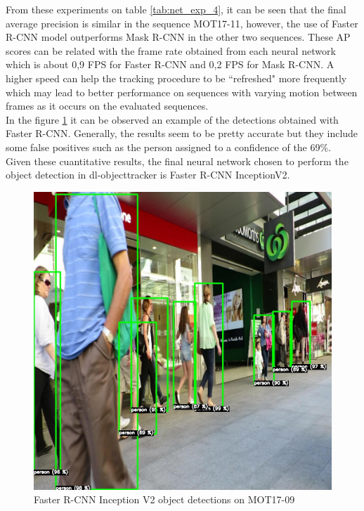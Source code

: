 From these experiments on table \ref{tab:net_exp_4}, it can be seen that the final average precision is similar in the sequence MOT17-11, however, the use of Faster R-CNN model outperforms Mask R-CNN in the other two sequences. These AP scores can be related with the frame rate obtained from each neural network which is about 0,9 FPS for Faster R-CNN and 0,2 FPS for Mask R-CNN. A higher speed can help the tracking procedure to be ``refreshed" more frequently which may lead to better performance on sequences with varying motion between frames as it occurs on the evaluated sequences.\\ In the figure \ref{fig:faster_dets} it can be observed an example of the detections obtained with Faster R-CNN. Generally, the results seem to be pretty accurate but they include some false positives such as the person assigned to a confidence of the 69\%.\\
Given these cuantitative results, the final neural network chosen to perform the object detection in dl-objecttracker is Faster R-CNN InceptionV2.
\begin{figure}[H]
\begin{center}
\includegraphics[scale=0.2]{figures/212.jpg}
\caption{Faster R-CNN Inception V2 object detections on MOT17-09}
\label{fig:faster_dets}
\end{center}
\end{figure}
